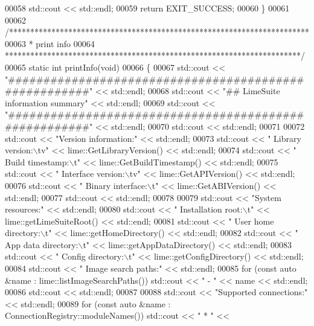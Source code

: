\begin{DoxyCode}
00058     std::cout << std::endl;
00059     \textcolor{keywordflow}{return} EXIT\_SUCCESS;
00060 \}
00061 
00062 \textcolor{comment}{/***********************************************************************}
00063 \textcolor{comment}{ * print info}
00064 \textcolor{comment}{ **********************************************************************/}
00065 \textcolor{keyword}{static} \textcolor{keywordtype}{int} printInfo(\textcolor{keywordtype}{void})
00066 \{
00067     std::cout << \textcolor{stringliteral}{"######################################################"} << std::endl;
00068     std::cout << \textcolor{stringliteral}{"## LimeSuite information summary"} << std::endl;
00069     std::cout << \textcolor{stringliteral}{"######################################################"} << std::endl;
00070     std::cout << std::endl;
00071 
00072     std::cout << \textcolor{stringliteral}{"Version information:"} << std::endl;
00073     std::cout << \textcolor{stringliteral}{"  Library version:\(\backslash\)tv"} << lime::GetLibraryVersion() << std::endl;
00074     std::cout << \textcolor{stringliteral}{"  Build timestamp:\(\backslash\)t"} << lime::GetBuildTimestamp() << std::endl;
00075     std::cout << \textcolor{stringliteral}{"  Interface version:\(\backslash\)tv"} << lime::GetAPIVersion() << std::endl;
00076     std::cout << \textcolor{stringliteral}{"  Binary interface:\(\backslash\)t"} << lime::GetABIVersion() << std::endl;
00077     std::cout << std::endl;
00078 
00079     std::cout << \textcolor{stringliteral}{"System resources:"} << std::endl;
00080     std::cout << \textcolor{stringliteral}{"  Installation root:\(\backslash\)t"} << lime::getLimeSuiteRoot() << std::endl;
00081     std::cout << \textcolor{stringliteral}{"  User home directory:\(\backslash\)t"} << lime::getHomeDirectory() << std::endl;
00082     std::cout << \textcolor{stringliteral}{"  App data directory:\(\backslash\)t"} << lime::getAppDataDirectory() << std::endl;
00083     std::cout << \textcolor{stringliteral}{"  Config directory:\(\backslash\)t"} << lime::getConfigDirectory() << std::endl;
00084     std::cout << \textcolor{stringliteral}{"  Image search paths:"} << std::endl;
00085     \textcolor{keywordflow}{for} (\textcolor{keyword}{const} \textcolor{keyword}{auto} &name : lime::listImageSearchPaths()) std::cout << \textcolor{stringliteral}{"     - "} << 
      name << std::endl;
00086     std::cout << std::endl;
00087 
00088     std::cout << \textcolor{stringliteral}{"Supported connections:"} << std::endl;
00089     \textcolor{keywordflow}{for} (\textcolor{keyword}{const} \textcolor{keyword}{auto} &name : ConnectionRegistry::moduleNames()) std::cout << \textcolor{stringliteral}{"   * "} << 

\end{DoxyCode}

